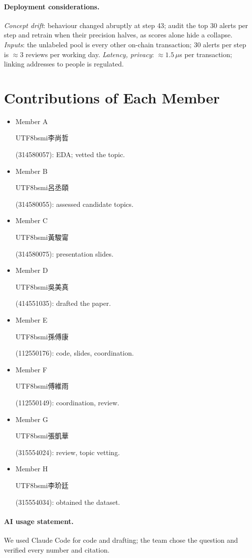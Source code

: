 \documentclass[11pt]{article}
\newcommand{\zh}[1]{\begin{CJK}{UTF8}{bsmi}#1\end{CJK}}
\newcommand{\member}[3]{\ifdefined\anonymous Member #1\else\zh{#2} (#3)\fi}
\begin{document}
\paragraph{Deployment considerations.}
\emph{Concept drift}: behaviour changed abruptly at step 43; audit the top 30 alerts per step and retrain when their precision halves, as scores alone hide a collapse.
\emph{Inputs}: the unlabeled pool is every other on-chain transaction; 30 alerts per step is ${\approx}$3 reviews per working day.
\emph{Latency, privacy}: ${\approx}1.5\,\mu$s per transaction; linking addresses to people is regulated.

\section*{Contributions of Each Member}

{\raggedright{}
\begin{itemize}[leftmargin=*,itemsep=0pt,parsep=0pt,topsep=2pt]
\item \member{A}{李尚哲}{314580057}: EDA; vetted the topic.
\item \member{B}{呂丞頤}{314580055}: assessed candidate topics.
\item \member{C}{黃駿甯}{314580075}: presentation slides.
\item \member{D}{吳美真}{414551035}: drafted the paper.
\item \member{E}{孫傅康}{112550176}: code, slides, coordination.
\item \member{F}{傅維雨}{112550149}: coordination, review.
\item \member{G}{張凱華}{315554024}: review, topic vetting.
\item \member{H}{李玠廷}{315554034}: obtained the dataset.
\end{itemize}
}

\paragraph{AI usage statement.}
We used Claude Code for code and drafting; the team chose the question and verified every number and citation.


\end{document}
